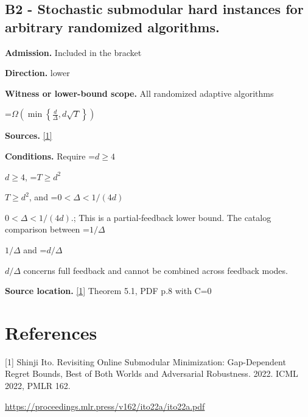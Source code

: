 \documentclass[10pt,a4paper]{article}
\newcommand{\AtlasMath}[1]{\par\begingroup\centering\setbox0=\hbox{$\displaystyle #1$}\ifdim\wd0>1.4\linewidth\typeout{ATLAS WIDE FORMULA: \the\wd0}\fi\ifdim\wd0>\linewidth\resizebox{\linewidth}{!}{\box0}\else\box0\fi\par\endgroup}
\newcommand{\AtlasInlineMath}[1]{\begingroup\setbox0=\hbox{$#1$}\ifdim\wd0>.4\linewidth\endgroup\AtlasMath{#1}\else\endgroup$#1$\fi}
\begin{document}
\subsection{B2 - Stochastic submodular hard instances for arbitrary randomized algorithms.}
\textbf{Admission.} Included in the bracket

\textbf{Direction.} lower

\textbf{Witness or lower-bound scope.} All randomized adaptive algorithms

\AtlasMath{\Omega\!\left(\min\!\left\{\frac d\Delta,d\sqrt T\right\}\right)}
\textbf{Sources.} \href{https://proceedings.mlr.press/v162/ito22a/ito22a.pdf}{[1]}

\textbf{Conditions.} Require \AtlasInlineMath{d\ge4}, \AtlasInlineMath{T\ge d^2}, and \AtlasInlineMath{0<\Delta<1/(4d)}.; This is a partial-feedback lower bound. The catalog comparison between \AtlasInlineMath{1/\Delta} and \AtlasInlineMath{d/\Delta} concerns full feedback and cannot be combined across feedback modes.

\textbf{Source location.} \href{https://proceedings.mlr.press/v162/ito22a/ito22a.pdf}{[1]} Theorem 5.1, PDF p.8 with C=0

\section{References}
[1] Shinji Ito. Revisiting Online Submodular Minimization: Gap-Dependent Regret Bounds, Best of Both Worlds and Adversarial Robustness. 2022. ICML 2022, PMLR 162.

\url{https://proceedings.mlr.press/v162/ito22a/ito22a.pdf}
\end{document}
